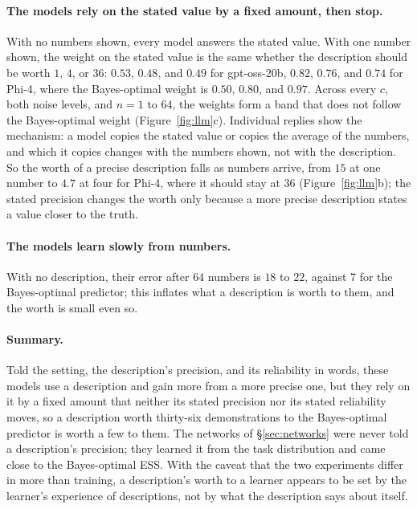 \documentclass{article}
\begin{document}
\paragraph{The models rely on the stated value by a fixed amount, then stop.} With no numbers shown, every model answers the stated value. With one number shown, the weight on the stated value is the same whether the description should be worth $1$, $4$, or $36$: $0.53$, $0.48$, and $0.49$ for gpt-oss-20b, $0.82$, $0.76$, and $0.74$ for Phi-4, where the Bayes-optimal weight is $0.50$, $0.80$, and $0.97$. Across every $c$, both noise levels, and $n = 1$ to $64$, the weights form a band that does not follow the Bayes-optimal weight (Figure~\ref{fig:llm}c). Individual replies show the mechanism: a model copies the stated value or copies the average of the numbers, and which it copies changes with the numbers shown, not with the description. So the worth of a precise description falls as numbers arrive, from $15$ at one number to $4.7$ at four for Phi-4, where it should stay at $36$ (Figure~\ref{fig:llm}b); the stated precision changes the worth only because a more precise description states a value closer to the truth.

\paragraph{The models learn slowly from numbers.} With no description, their error after $64$ numbers is $18$ to $22$, against $7$ for the Bayes-optimal predictor; this inflates what a description is worth to them, and the worth is small even so.

\paragraph{Summary.} Told the setting, the description's precision, and its reliability in words, these models use a description and gain more from a more precise one, but they rely on it by a fixed amount that neither its stated precision nor its stated reliability moves, so a description worth thirty-six demonstrations to the Bayes-optimal predictor is worth a few to them. The networks of \S\ref{sec:networks} were never told a description's precision; they learned it from the task distribution and came close to the Bayes-optimal ESS. With the caveat that the two experiments differ in more than training, a description's worth to a learner appears to be set by the learner's experience of descriptions, not by what the description says about itself.
\end{document}
